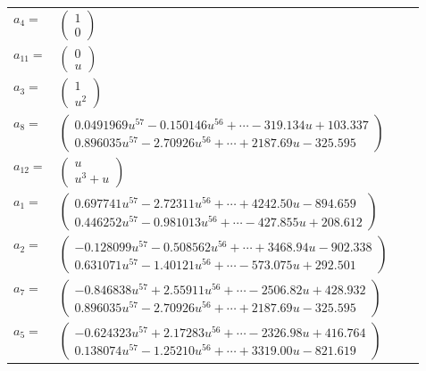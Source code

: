 \documentclass[1p]{elsarticle_modified}
\theoremstyle{definition}
\begin{document}
\begin{tabular}{m{7pt} m{180pt} m{7pt} m{180pt} }
\flushright $a_{4}=$&$\begin{pmatrix}1\\0\end{pmatrix}$ \\
\flushright $a_{11}=$&$\begin{pmatrix}0\\u\end{pmatrix}$ \\
\flushright $a_{3}=$&$\begin{pmatrix}1\\u^2\end{pmatrix}$ \\
\flushright $a_{8}=$&$\begin{pmatrix}0.0491969 u^{57}-0.150146 u^{56}+\cdots-319.134 u+103.337\\0.896035 u^{57}-2.70926 u^{56}+\cdots+2187.69 u-325.595\end{pmatrix}$ \\
\flushright $a_{12}=$&$\begin{pmatrix}u\\u^3+u\end{pmatrix}$ \\
\flushright $a_{1}=$&$\begin{pmatrix}0.697741 u^{57}-2.72311 u^{56}+\cdots+4242.50 u-894.659\\0.446252 u^{57}-0.981013 u^{56}+\cdots-427.855 u+208.612\end{pmatrix}$ \\
\flushright $a_{2}=$&$\begin{pmatrix}-0.128099 u^{57}-0.508562 u^{56}+\cdots+3468.94 u-902.338\\0.631071 u^{57}-1.40121 u^{56}+\cdots-573.075 u+292.501\end{pmatrix}$ \\
\flushright $a_{7}=$&$\begin{pmatrix}-0.846838 u^{57}+2.55911 u^{56}+\cdots-2506.82 u+428.932\\0.896035 u^{57}-2.70926 u^{56}+\cdots+2187.69 u-325.595\end{pmatrix}$ \\
\flushright $a_{5}=$&$\begin{pmatrix}-0.624323 u^{57}+2.17283 u^{56}+\cdots-2326.98 u+416.764\\0.138074 u^{57}-1.25210 u^{56}+\cdots+3319.00 u-821.619\end{pmatrix}$ \\

\end{tabular}
\end{document}

